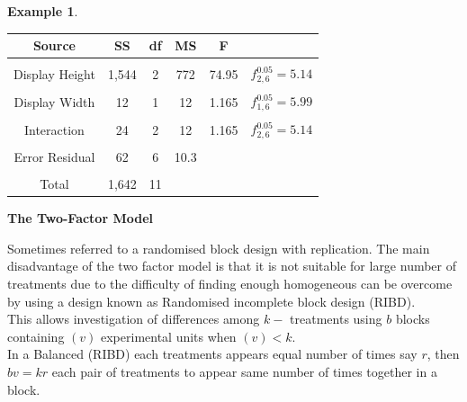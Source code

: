 \documentclass[11pt,a4paper]{article}
\theoremstyle{definition}
\newtheorem{exa}[thm]{Example}
\newcommand{\subhead}[1]{%
  \par\medskip\noindent\textbf{#1}\par\nobreak\smallskip}
\begin{document}
\begin{exa}
\begin{table}[H]
\centering
\begin{tabular}{|c|ccccc|}
\hline
Source & SS & df & MS & F &\\
\hline
&&&&&\\
Display Height & 1,544 & 2 & 772 & 74.95 & $f^{0.05}_{2,6}=5.14$\\
&&&&&\\
Display Width & 12 & 1 & 12 & 1.165 & $f^{0.05}_{1,6}=5.99$\\
&&&&&\\
Interaction & 24 & 2 & 12 & 1.165 & $f^{0.05}_{2,6}=5.14$\\
&&&&&\\
Error Residual & 62 & 6 & 10.3 && \\
\hline
&&&&&\\
Total & 1,642 & 11 &&&\\
\hline
\end{tabular}
\end{table}



\subhead{The Two-Factor Model}
Sometimes referred to a  randomised block design with replication. The main disadvantage of the two factor model is that it is not suitable for large number of treatments due to the difficulty of finding enough homogeneous can be overcome by using a design known as Randomised incomplete block design (RIBD).\\
This allows investigation of differences among $k-$ treatments using $b$ blocks containing $(v)$ experimental units when $(v)<k$.\\

In a Balanced (RIBD) each treatments appears equal number of times say $r$, then $bv=kr$ each pair of treatments to appear same number of times together in a block.
\end{exa}
\end{document}
